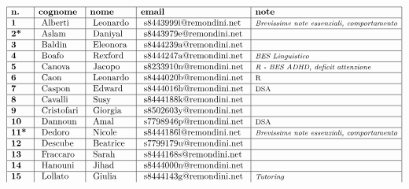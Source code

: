 \documentclass[10pt, a4paper twoside, notitlepage, notoc, justified]{tufte-handout}
\begin{document}
$$
\begin{array}{|l|l|l|l|l|}
\hline \text {\bf n.} & \text {\bf cognome } & \text {\bf nome } & \text {\bf email } & \text {\bf note }\\
\hline \text {\bf 1 } & \text { Alberti } & \text { Leonardo } & \text { s8443999i@remondini.net } & \text {\emph {\footnotesize Brevissime note essenziali, comportamento}}\\
\hline \text {\bf 2* } & \text { Aslam } & \text { Daniyal } & \text { s8443979e@remondini.net } & \\
\hline \text {\bf 3 } & \text { Baldin } & \text { Eleonora } & \text { s8444239a@remondini.net } & \\
\hline \text {\bf 4 } & \text { Boafo } & \text { Rexford } & \text { s8444247a@remondini.net } & \text {\emph {\footnotesize BES Linguistico}}\\
\hline \text {\bf 5 } & \text { Canova } & \text { Jacopo } & \text { s8233910n@remondini.net } & \text {\emph {\footnotesize R - BES ADHD, deficit attenzione}}\\
\hline \text {\bf 6 } & \text { Caon } & \text { Leonardo } & \text { s8444020b@remondini.net } & \text {\emph {\emph {\footnotesize R}}}\\
\hline \text {\bf 7 } & \text { Caspon } & \text { Edward } & \text { s8444016h@remondini.net } & \text {\footnotesize DSA}\\
\hline \text {\bf 8 } & \text { Cavalli } & \text { Susy } & \text { s8444188k@remondini.net } & \\
\hline \text {\bf 9 } & \text { Cristofari } & \text { Giorgia } & \text { s8502603y@remondini.net } & \\
\hline \text {\bf 10 } & \text { Dannoun } & \text { Amal } & \text { s7798946p@remondini.net } & \text {\footnotesize DSA}\\
\hline \text {\bf 11* } & \text { Dedoro } & \text { Nicole } & \text { s8444186l@remondini.net } & \text {\emph {\footnotesize Brevissime note essenziali, comportamento}}\\
\hline \text {\bf 12 } & \text { Descube } & \text { Beatrice } & \text { s7799179u@remondini.net } & \\
\hline \text {\bf 13 } & \text { Fraccaro } & \text { Sarah } & \text { s8444168s@remondini.net } & \\
\hline \text {\bf 14 } & \text { Hanouni } & \text { Jihad } & \text { s8444000n@remondini.net } & \\
\hline \text {\bf 15 } & \text { Lollato } & \text { Giulia } & \text { s8444143g@remondini.net } & \text {\emph {\footnotesize Tutoring }}\\

\end{array}$$
\end{document}
